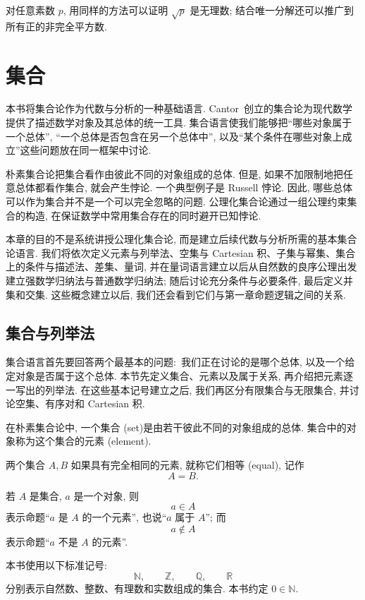 \documentclass[usesamecnt, thmcnt=section, lang=cn, newtx, 10pt, scheme=chinese]{elegantbook}
\begin{document}
对任意素数 $p$, 用同样的方法可以证明 $\sqrt{p}$ 是无理数; 结合唯一分解还可以推广到所有正的非完全平方数.

\chapter{集合}

本书将集合论作为代数与分析的一种基础语言. Cantor~创立的集合论为现代数学提供了描述数学对象及其总体的统一工具. 集合语言使我们能够把``哪些对象属于一个总体'', ``一个总体是否包含在另一个总体中'', 以及``某个条件在哪些对象上成立''这些问题放在同一框架中讨论.

朴素集合论把集合看作由彼此不同的对象组成的总体. 但是, 如果不加限制地把任意总体都看作集合, 就会产生悖论. 一个典型例子是 Russell 悖论. 因此, 哪些总体可以作为集合并不是一个可以完全忽略的问题. 公理化集合论通过一组公理约束集合的构造, 在保证数学中常用集合存在的同时避开已知悖论.

本章的目的不是系统讲授公理化集合论, 而是建立后续代数与分析所需的基本集合论语言. 我们将依次定义元素与列举法、空集与 Cartesian 积、子集与幂集、集合上的条件与描述法、差集、量词, 并在量词语言建立以后从自然数的良序公理出发建立强数学归纳法与普通数学归纳法; 随后讨论充分条件与必要条件, 最后定义并集和交集. 这些概念建立以后, 我们还会看到它们与第一章命题逻辑之间的关系.

\section{集合与列举法}

集合语言首先要回答两个最基本的问题:~我们正在讨论的是哪个总体, 以及一个给定对象是否属于这个总体. 本节先定义集合、元素以及属于关系, 再介绍把元素逐一写出的列举法. 在这些基本记号建立之后, 我们再区分有限集合与无限集合, 并讨论空集、有序对和 Cartesian 积.

\begin{definition}\label{def:sets-set-element}
在朴素集合论中, 一个{\color{blue}集合 (set)}是由若干彼此不同的对象组成的总体. 集合中的对象称为这个集合的{\color{blue}元素 (element)}.

两个集合 $A,B$ 如果具有完全相同的元素, 就称它们{\color{blue}相等 (equal)}, 记作
\[
 A=B.
\]

若 $A$ 是集合, $a$ 是一个对象, 则
\[
 a\in A
\]
表示命题``$a$ 是 $A$ 的一个元素'', 也说``$a$ 属于 $A$''; 而
\[
 a\notin A
\]
表示命题``$a$ 不是 $A$ 的元素''.
\end{definition}

\begin{notation}[常用数集]
本书使用以下标准记号:
\[
 \mathbb N,\qquad \mathbb Z,\qquad \mathbb Q,\qquad \mathbb R
\]
分别表示自然数、整数、有理数和实数组成的集合. 本书约定 $0\in\mathbb N$.
\end{notation}
\end{document}

